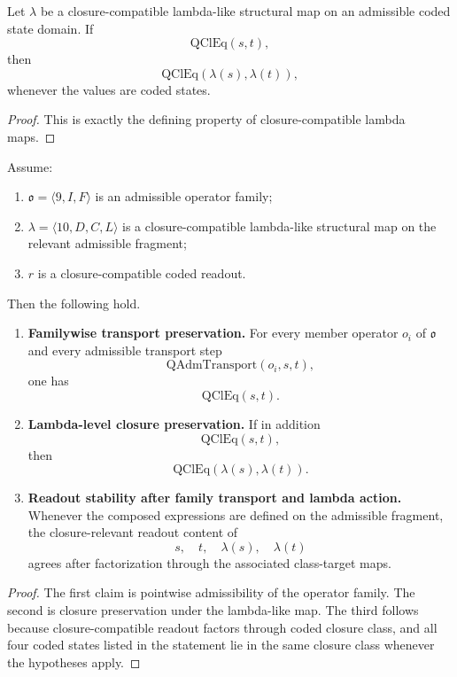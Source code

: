 \begin{proposition}
Let $\lambda$ be a closure-compatible lambda-like structural map on an admissible coded state domain. If
\[
\mathrm{QClEq}(s,t),
\]
then
\[
\mathrm{QClEq}(\lambda(s),\lambda(t)),
\]
whenever the values are coded states.
\end{proposition}

\begin{proof}
This is exactly the defining property of closure-compatible lambda maps.
\end{proof}

\begin{theorem}
Assume:
\begin{enumerate}
\item $\mathfrak{o}=\langle 9,I,F\rangle$ is an admissible operator family;
\item $\lambda=\langle 10,D,C,L\rangle$ is a closure-compatible lambda-like structural map on the relevant admissible fragment;
\item $r$ is a closure-compatible coded readout.
\end{enumerate}
Then the following hold.
\begin{enumerate}
\item \textbf{Familywise transport preservation.}  
For every member operator $o_i$ of $\mathfrak{o}$ and every admissible transport step
\[
\mathrm{QAdmTransport}(o_i,s,t),
\]
one has
\[
\mathrm{QClEq}(s,t).
\]

\item \textbf{Lambda-level closure preservation.}  
If in addition
\[
\mathrm{QClEq}(s,t),
\]
then
\[
\mathrm{QClEq}(\lambda(s),\lambda(t)).
\]

\item \textbf{Readout stability after family transport and lambda action.}  
Whenever the composed expressions are defined on the admissible fragment, the closure-relevant readout content of
\[
s,
\quad t,
\quad \lambda(s),
\quad \lambda(t)
\]
agrees after factorization through the associated class-target maps.
\end{enumerate}
\end{theorem}

\begin{proof}
The first claim is pointwise admissibility of the operator family. The second is closure preservation under the lambda-like map. The third follows because closure-compatible readout factors through coded closure class, and all four coded states listed in the statement lie in the same closure class whenever the hypotheses apply.
\end{proof}

